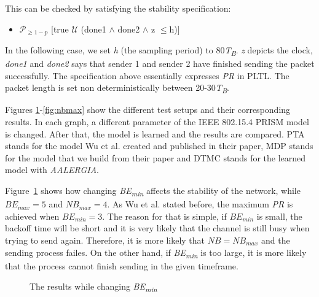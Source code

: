 \documentclass[
a4paper,
12pt
]{scrartcl}
\begin{document}
This can be checked by satisfying the stability specification:

\begin{itemize}
  \item $\mathcal{P}_{\geq1-p}$ [true $\mathcal{U}$ (done1 $\land$ done2 $\land$ z $\leq$h)]
\end{itemize}

In the following case, we set \textit{h} (the sampling period) to 80\textit{T\textsubscript{B}}. \textit{z} depicts the clock, \textit{done1} and \textit{done2} says that sender 1 and sender 2 have finished sending the packet successfully. The specification above essentially expresses \textit{PR} in PLTL. The packet length is set non deterministically between 20-30\textit{T\textsubscript{B}}.

Figures \ref{fig:bemin}-\ref{fig:nbmax} show the different test setups and their corresponding results. In each graph, a different parameter of the IEEE 802.15.4 PRISM model is changed. After that, the model is learned and the results are compared. PTA stands for the model Wu et al. created and published in their paper, MDP stands for the model that we build from their paper and DTMC stands for the learned model with \emph{AALERGIA}.

Figure~\ref{fig:bemin} shows how changing \textit{BE\textsubscript{min}} affects the stability of the network, while $BE_{max}=5$ and $NB_{max}=4$. As Wu et al. stated before, the maximum \textit{PR} is achieved when $BE_{min}=3$. The reason for that is simple, if $BE_{min}$ is small, the backoff time will be short and it is very likely that the channel is still busy when trying to send again. Therefore, it is more likely that $NB=NB_{max}$ and the sending process failes. On the other hand, if \textit{BE\textsubscript{min}} is too large, it is more likely that the process cannot finish sending in the given timeframe.

\begin{figure}[H]
\centering
 \caption{The results while changing \textit{BE\textsubscript{min}}}
  \label{fig:bemin}
\end{figure}
\end{document}
